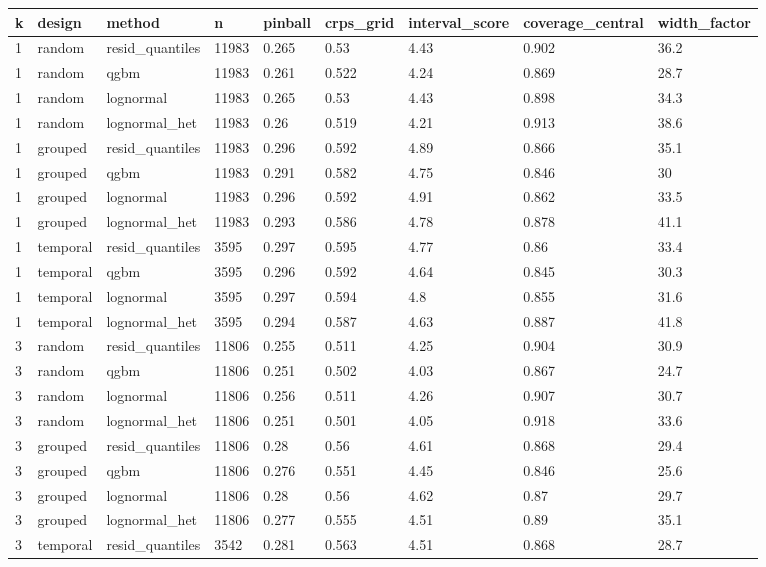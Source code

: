 \begin{tabular}{lllllllll}
\toprule
k & design & method & n & pinball & crps\_grid & interval\_score & coverage\_central & width\_factor \\
\midrule
1 & random & resid\_quantiles & 11983 & 0.265 & 0.53 & 4.43 & 0.902 & 36.2 \\
1 & random & qgbm & 11983 & 0.261 & 0.522 & 4.24 & 0.869 & 28.7 \\
1 & random & lognormal & 11983 & 0.265 & 0.53 & 4.43 & 0.898 & 34.3 \\
1 & random & lognormal\_het & 11983 & 0.26 & 0.519 & 4.21 & 0.913 & 38.6 \\
1 & grouped & resid\_quantiles & 11983 & 0.296 & 0.592 & 4.89 & 0.866 & 35.1 \\
1 & grouped & qgbm & 11983 & 0.291 & 0.582 & 4.75 & 0.846 & 30 \\
1 & grouped & lognormal & 11983 & 0.296 & 0.592 & 4.91 & 0.862 & 33.5 \\
1 & grouped & lognormal\_het & 11983 & 0.293 & 0.586 & 4.78 & 0.878 & 41.1 \\
1 & temporal & resid\_quantiles & 3595 & 0.297 & 0.595 & 4.77 & 0.86 & 33.4 \\
1 & temporal & qgbm & 3595 & 0.296 & 0.592 & 4.64 & 0.845 & 30.3 \\
1 & temporal & lognormal & 3595 & 0.297 & 0.594 & 4.8 & 0.855 & 31.6 \\
1 & temporal & lognormal\_het & 3595 & 0.294 & 0.587 & 4.63 & 0.887 & 41.8 \\
3 & random & resid\_quantiles & 11806 & 0.255 & 0.511 & 4.25 & 0.904 & 30.9 \\
3 & random & qgbm & 11806 & 0.251 & 0.502 & 4.03 & 0.867 & 24.7 \\
3 & random & lognormal & 11806 & 0.256 & 0.511 & 4.26 & 0.907 & 30.7 \\
3 & random & lognormal\_het & 11806 & 0.251 & 0.501 & 4.05 & 0.918 & 33.6 \\
3 & grouped & resid\_quantiles & 11806 & 0.28 & 0.56 & 4.61 & 0.868 & 29.4 \\
3 & grouped & qgbm & 11806 & 0.276 & 0.551 & 4.45 & 0.846 & 25.6 \\
3 & grouped & lognormal & 11806 & 0.28 & 0.56 & 4.62 & 0.87 & 29.7 \\
3 & grouped & lognormal\_het & 11806 & 0.277 & 0.555 & 4.51 & 0.89 & 35.1 \\
3 & temporal & resid\_quantiles & 3542 & 0.281 & 0.563 & 4.51 & 0.868 & 28.7 \\

\end{tabular}
